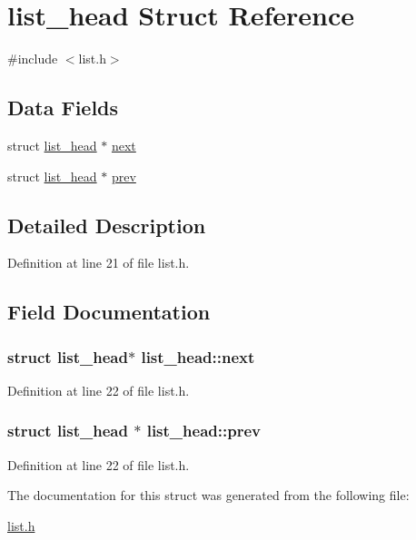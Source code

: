 \hypertarget{structlist__head}{}\section{list\+\_\+head Struct Reference}
\label{structlist__head}


{\ttfamily \#include $<$list.\+h$>$}

\subsection*{Data Fields}
\begin{DoxyCompactItemize}
\item 
struct \hyperlink{structlist__head}{list\+\_\+head} $\ast$ \hyperlink{structlist__head_ac3b0ff0dfb978a0cfbdad6b9d19cdcfe}{next}
\item 
struct \hyperlink{structlist__head}{list\+\_\+head} $\ast$ \hyperlink{structlist__head_aaa0eabda8877e1d6de73a33f223ad004}{prev}
\end{DoxyCompactItemize}


\subsection{Detailed Description}


Definition at line 21 of file list.\+h.



\subsection{Field Documentation}
\subsubsection[{\texorpdfstring{next}{next}}]{\setlength{\rightskip}{0pt plus 5cm}struct {\bf list\+\_\+head}$\ast$ list\+\_\+head\+::next}\hypertarget{structlist__head_ac3b0ff0dfb978a0cfbdad6b9d19cdcfe}{}\label{structlist__head_ac3b0ff0dfb978a0cfbdad6b9d19cdcfe}


Definition at line 22 of file list.\+h.

\subsubsection[{\texorpdfstring{prev}{prev}}]{\setlength{\rightskip}{0pt plus 5cm}struct {\bf list\+\_\+head} $\ast$ list\+\_\+head\+::prev}\hypertarget{structlist__head_aaa0eabda8877e1d6de73a33f223ad004}{}\label{structlist__head_aaa0eabda8877e1d6de73a33f223ad004}


Definition at line 22 of file list.\+h.



The documentation for this struct was generated from the following file\+:\begin{DoxyCompactItemize}
\item 
\hyperlink{list_8h}{list.\+h}\end{DoxyCompactItemize}
